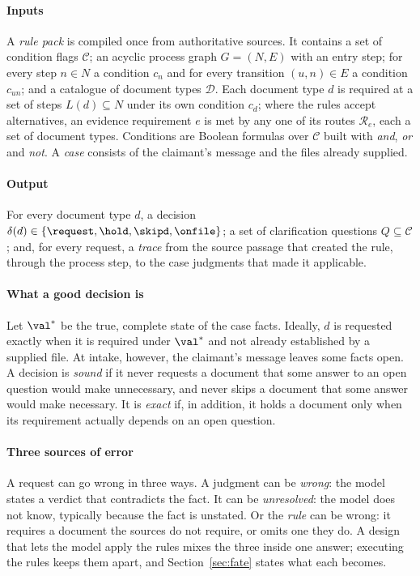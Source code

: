 \paragraph{Inputs}
A \emph{rule pack} is compiled once from authoritative sources. It contains a set of condition flags $\mathcal{C}$; an acyclic process graph $G=(N,E)$ with an entry step; for every step $n\in N$ a condition $c_n$ and for every transition $(u,n)\in E$ a condition $c_{un}$; and a catalogue of document types $\mathcal{D}$. Each document type $d$ is required at a set of steps $L(d)\subseteq N$ under its own condition $c_d$; where the rules accept alternatives, an evidence requirement $e$ is met by any one of its routes $\mathcal{R}_e$, each a set of document types. Conditions are Boolean formulas over $\mathcal{C}$ built with \emph{and}, \emph{or} and \emph{not}. A \emph{case} consists of the claimant's message and the files already supplied.

\paragraph{Output}
For every document type $d$, a decision $\delta(d)\in\{\request,\hold,\skipd,\onfile\}$; a set of clarification questions $Q\subseteq\mathcal{C}$; and, for every request, a \emph{trace} from the source passage that created the rule, through the process step, to the case judgments that made it applicable.

\paragraph{What a good decision is}
Let $\val^\ast$ be the true, complete state of the case facts. Ideally, $d$ is requested exactly when it is required under $\val^\ast$ and not already established by a supplied file. At intake, however, the claimant's message leaves some facts open. A decision is \emph{sound} if it never requests a document that some answer to an open question would make unnecessary, and never skips a document that some answer would make necessary. It is \emph{exact} if, in addition, it holds a document only when its requirement actually depends on an open question.

\paragraph{Three sources of error}
A request can go wrong in three ways. A judgment can be \emph{wrong}: the model states a verdict that contradicts the fact. It can be \emph{unresolved}: the model does not know, typically because the fact is unstated. Or the \emph{rule} can be wrong: it requires a document the sources do not require, or omits one they do. A design that lets the model apply the rules mixes the three inside one answer; executing the rules keeps them apart, and Section~\ref{sec:fate} states what each becomes.

